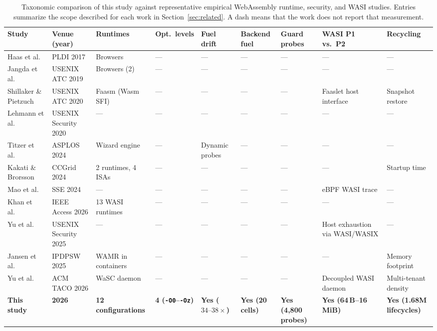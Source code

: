 \begin{table}[t]
\caption{Taxonomic comparison of this study against representative empirical WebAssembly runtime, security, and WASI studies. Entries summarize the scope described for each work in Section~\ref{sec:related}. A dash means that the work does not report that measurement.}\label{tab:lit_taxonomy}
\footnotesize
\setlength{\tabcolsep}{3pt}%
\begin{adjustbox}{max width=\textwidth}%
\begin{tabular}{lllllllll}
\toprule
Study & Venue (year) & Runtimes & Opt.\ levels & Fuel drift & Backend fuel & Guard probes & WASI P1 vs.\ P2 & Recycling \\
\midrule
Haas et al.~\cite{haas2017bringing} & PLDI 2017 & Browsers & --- & --- & --- & --- & --- & --- \\
Jangda et al.~\cite{jangda2019not} & USENIX ATC 2019 & Browsers (2) & --- & --- & --- & --- & --- & --- \\
Shillaker \& Pietzuch~\cite{shillaker2020faasm} & USENIX ATC 2020 & Faasm (Wasm SFI) & --- & --- & --- & --- & Faaslet host interface & Snapshot restore \\
Lehmann et al.~\cite{lehmann2020binary} & USENIX Security 2020 & --- & --- & --- & --- & --- & --- & --- \\
Titzer et al.~\cite{titzer2024flexible} & ASPLOS 2024 & Wizard engine & --- & Dynamic probes & --- & --- & --- & --- \\
Kakati \& Brorsson~\cite{kakati2024cross} & CCGrid 2024 & 2 runtimes, 4 ISAs & --- & --- & --- & --- & --- & Startup time \\
Mao et al.~\cite{mao2024ewapa} & SSE 2024 & --- & --- & --- & --- & --- & eBPF WASI trace & --- \\
Khan et al.~\cite{khan2026taxonomy} & IEEE Access 2026 & 13 WASI runtimes & --- & --- & --- & --- & --- & --- \\
Yu et al.~\cite{yu2025resource} & USENIX Security 2025 & --- & --- & --- & --- & --- & Host exhaustion via WASI/WASIX & --- \\
Jansen et al.~\cite{jansen2025memory} & IPDPSW 2025 & WAMR in containers & --- & --- & --- & --- & --- & Memory footprint \\
Yu et al.~\cite{yu2026wasc} & ACM TACO 2026 & WaSC daemon & --- & --- & --- & --- & Decoupled WASI daemon & Multi-tenant density \\
\midrule
\textbf{This study} & \textbf{2026} & \textbf{12 configurations} & \textbf{4 (\texttt{-O0}--\texttt{-Oz})} & \textbf{Yes ($34\text{--}38\times$)} & \textbf{Yes (20 cells)} & \textbf{Yes (4,800 probes)} & \textbf{Yes (64\,B--16\,MiB)} & \textbf{Yes (1.68M lifecycles)} \\
\bottomrule
\end{tabular}%
\end{adjustbox}
\end{table}
